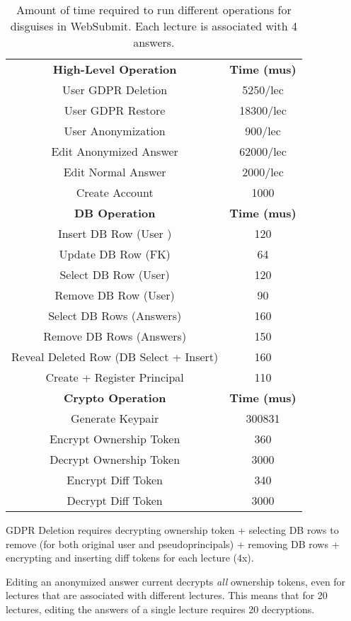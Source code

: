 \begin{table}
\begin{center}
\begin{tabular}{ c c }
 \textbf{High-Level Operation} & \textbf{Time (mus)}\\
    User GDPR Deletion & 5250/lec\\
    User GDPR Restore & 18300/lec\\
    User Anonymization & 900/lec\\
    Edit Anonymized Answer & 62000/lec \\
    Edit Normal Answer & 2000/lec \\
    Create Account & 1000\\
\hline
    \textbf{DB Operation} & \textbf{Time (mus)}\\
\hline
Insert DB Row (User )& 120\\
Update DB Row (FK) & 64\\ 
Select DB Row (User) & 120\\
Remove DB Row (User) & 90\\
Select DB Rows (Answers) & 160\\
Remove DB Rows (Answers) & 150\\
Reveal Deleted Row (DB Select + Insert) & 160 \\
Create + Register Principal & 110\\
\hline
    \textbf{Crypto Operation} & \textbf{Time (mus)}\\
\hline
Generate Keypair & 300831\\
Encrypt Ownership Token & 360\\
Decrypt Ownership Token & 3000\\
Encrypt Diff Token & 340\\
Decrypt Diff Token & 3000\\
\end{tabular}
\end{center}
\caption{Amount of time required to run different operations for disguises in WebSubmit. Each
    lecture is associated with 4 answers.}
\end{table}

GDPR Deletion requires decrypting ownership token + selecting DB rows to remove (for both original
user and pseudoprincipals) + removing DB rows +
encrypting and inserting diff tokens for each lecture (4x).

Editing an anonymized answer current decrypts \emph{all} ownership tokens, even for lectures that
are associated with different lectures. This means that for 20 lectures, editing the answers
of a single lecture requires 20 decryptions.
